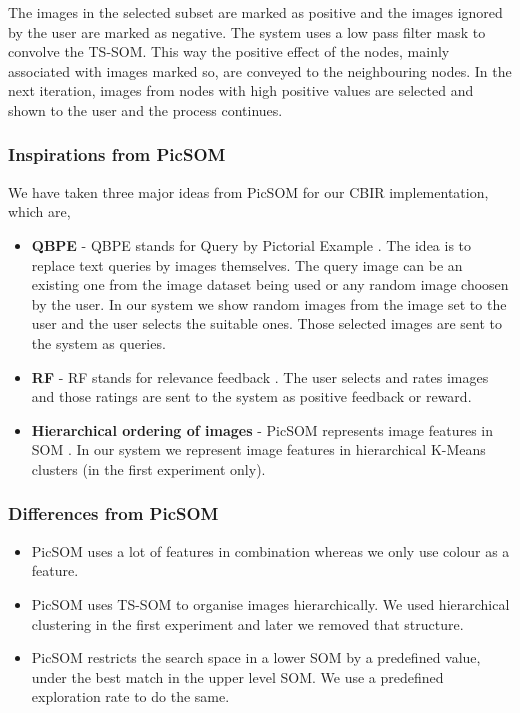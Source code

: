 \documentclass[english]{tktltiki}
\begin{document}
The images in the selected subset are marked as positive and the images ignored by the user are marked as negative. The system uses a low pass filter mask to convolve the TS-SOM. This way the positive effect of the nodes, mainly associated with images marked so, are conveyed to the neighbouring nodes. In the next iteration, images from nodes with high positive values are selected and shown to the user and the process continues.

\subsubsection{Inspirations from PicSOM}

We have taken three major ideas from PicSOM for our CBIR implementation, which are,

\begin{itemize}
	\item \textbf{QBPE} - QBPE stands for Query by Pictorial Example \cite{qbpe}. The idea is to replace text queries by images themselves. The query image can be an existing one from the image dataset being used or any random image choosen by the user. In our system we show random images from the image set to the user and the user selects the suitable ones. Those selected images are sent to the system as queries.
	\item \textbf{RF} - RF stands for relevance feedback \cite{rel_feed}. The user selects and rates images and those ratings are sent to the system as positive feedback or reward.
	\item \textbf{Hierarchical ordering of images} - PicSOM represents image features in SOM \cite{SOM}. In our system we represent image features in hierarchical K-Means \cite{k_means} clusters (in the first experiment only).
\end{itemize}

\subsubsection{Differences from PicSOM}

\begin{itemize}
	\item PicSOM uses a lot of features in combination whereas we only use colour as a feature.
	\item PicSOM uses TS-SOM to organise images hierarchically. We used hierarchical clustering in the first experiment and later we removed that structure.
	\item PicSOM restricts the search space in a lower SOM by a predefined value, under the best match in the upper level SOM. We use a predefined exploration rate to do the same.
\end{itemize}
\end{document}
